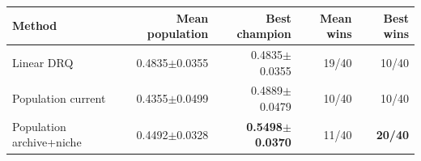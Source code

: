 \begin{tabular}{lrrrr}
\toprule
Method & Mean population & Best champion & Mean wins & Best wins \\
\midrule
Linear DRQ & 0.4835$\pm$0.0355 & 0.4835$\pm$0.0355 & 19/40 & 10/40 \\
Population current & 0.4355$\pm$0.0499 & 0.4889$\pm$0.0479 & 10/40 & 10/40 \\
Population archive+niche & 0.4492$\pm$0.0328 & \textbf{0.5498$\pm$0.0370} & 11/40 & \textbf{20/40} \\
\bottomrule
\end{tabular}
